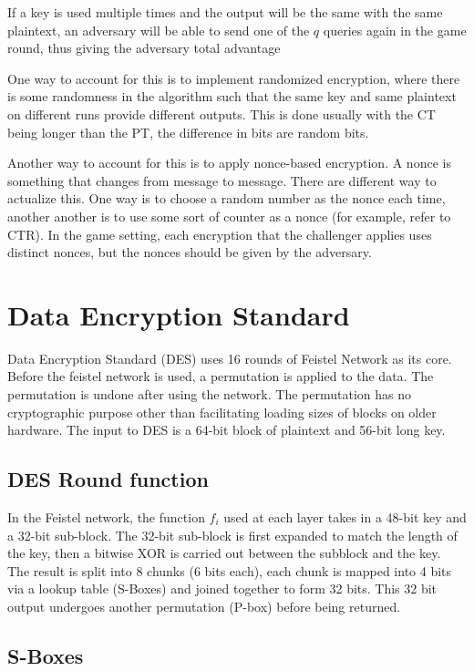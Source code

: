 \documentclass{article}
\begin{document}
\begin{multicols}{2}
If a key is used multiple times and the output will be the same with the same plaintext, an adversary will be able to send one of the $q$ queries again in the game round, thus giving the adversary total advantage

One way to account for this is to implement randomized encryption, where there is some randomness in the algorithm such that the same key and same plaintext on different runs provide different outputs. This is done usually with the CT being longer than the PT, the difference in bits are random bits.

Another way to account for this is to apply nonce-based encryption. A nonce is something that changes from message to message. There are different way to actualize this. One way is to choose a random number as the nonce each time, another another is to use some sort of counter as a nonce (for example, refer to CTR). In the game setting, each encryption that the challenger applies uses distinct nonces, but the nonces should be given by the adversary.

\section{Data Encryption Standard}

Data Encryption Standard (DES) uses 16 rounds of Feistel Network as its core. Before the feistel network is used, a permutation is applied to the data. The permutation is undone after using the network. The permutation has no cryptographic purpose other than facilitating loading sizes of blocks on older hardware. The input to DES is a 64-bit block of plaintext and 56-bit long key.

\subsection{DES Round function}

In the Feistel network, the function $f_i$ used at each layer takes in a 48-bit key and a 32-bit sub-block. The 32-bit sub-block is first expanded to match the length of the key, then a bitwise XOR is carried out between the subblock and the key. The result is split into 8 chunks (6 bits each), each chunk is mapped into 4 bits via a lookup table (S-Boxes) and joined together to form 32 bits. This 32 bit output undergoes another permutation (P-box) before being returned.

\subsection{S-Boxes}


\end{multicols}
\end{document}
